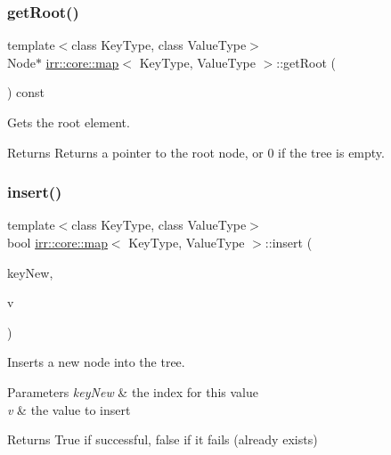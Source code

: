 \subsubsection{\texorpdfstring{get\+Root()}{getRoot()}\hspace{0.1cm}{\footnotesize\ttfamily [2/2]}}
{\footnotesize\ttfamily template$<$class Key\+Type, class Value\+Type$>$ \\
Node$\ast$ \hyperlink{classirr_1_1core_1_1map}{irr\+::core\+::map}$<$ Key\+Type, Value\+Type $>$\+::get\+Root (\begin{DoxyParamCaption}{ }\end{DoxyParamCaption}) const\hspace{0.3cm}{\ttfamily [inline]}}



Gets the root element. 

\begin{DoxyReturn}{Returns}
Returns a pointer to the root node, or 0 if the tree is empty. 
\end{DoxyReturn}
\mbox{\label{classirr_1_1core_1_1map_af9f8f34cab620e3bdc1ae72715ab9d15}} 
\subsubsection{\texorpdfstring{insert()}{insert()}\hspace{0.1cm}{\footnotesize\ttfamily [1/2]}}
{\footnotesize\ttfamily template$<$class Key\+Type, class Value\+Type$>$ \\
bool \hyperlink{classirr_1_1core_1_1map}{irr\+::core\+::map}$<$ Key\+Type, Value\+Type $>$\+::insert (\begin{DoxyParamCaption}\item[{const Key\+Type \&}]{key\+New,  }\item[{const Value\+Type \&}]{v }\end{DoxyParamCaption})\hspace{0.3cm}{\ttfamily [inline]}}



Inserts a new node into the tree. 


\begin{DoxyParams}{Parameters}
{\em key\+New} & the index for this value \\
\hline
{\em v} & the value to insert \\
\hline
\end{DoxyParams}
\begin{DoxyReturn}{Returns}
True if successful, false if it fails (already exists) 
\end{DoxyReturn}
\mbox{\label{classirr_1_1core_1_1map_af9f8f34cab620e3bdc1ae72715ab9d15}} 
